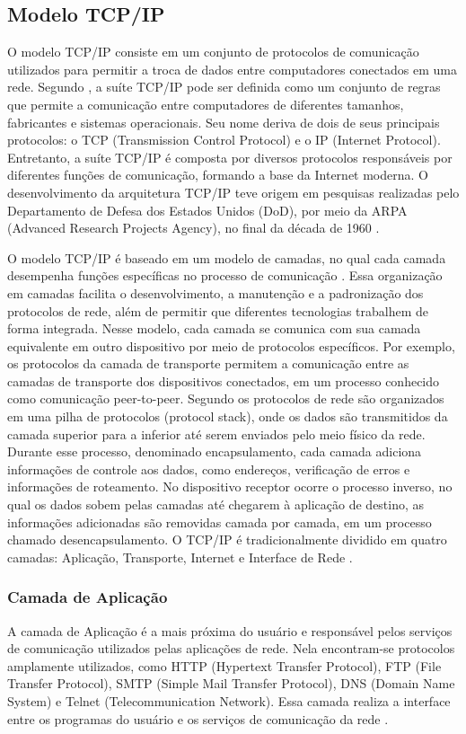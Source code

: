 \documentclass[
    12pt,                %
    openright,           %
    oneside,             %
    a4paper,             %
    english,             %
    brazil               %
]{abntex2}
\begin{document}
\subsection{Modelo TCP/IP}

O modelo TCP/IP consiste em um conjunto de protocolos de comunicação utilizados para permitir a troca de dados entre computadores conectados em uma rede. Segundo , a suíte TCP/IP pode ser definida como um conjunto de regras que permite a comunicação entre computadores de diferentes tamanhos, fabricantes e sistemas operacionais. Seu nome deriva de dois de seus principais protocolos: o TCP (Transmission Control Protocol) e o IP (Internet Protocol). Entretanto, a suíte TCP/IP é composta por diversos protocolos responsáveis por diferentes funções de comunicação, formando a base da Internet moderna. O desenvolvimento da arquitetura TCP/IP teve origem em pesquisas realizadas pelo Departamento de Defesa dos Estados Unidos (DoD), por meio da ARPA (Advanced Research Projects Agency), no final da década de 1960 \cite{Stevens1994}.


O modelo TCP/IP é baseado em um modelo de camadas, no qual cada camada desempenha funções específicas no processo de comunicação \cite{Stevens1994}. Essa organização em camadas facilita o desenvolvimento, a manutenção e a padronização dos protocolos de rede, além de permitir que diferentes tecnologias trabalhem de forma integrada. Nesse modelo, cada camada se comunica com sua camada equivalente em outro dispositivo por meio de protocolos específicos. Por exemplo, os protocolos da camada de transporte permitem a comunicação entre as camadas de transporte dos dispositivos conectados, em um processo conhecido como comunicação peer-to-peer. Segundo  os protocolos de rede são organizados em uma pilha de protocolos (protocol stack), onde os dados são transmitidos da camada superior para a inferior até serem enviados pelo meio físico da rede. Durante esse processo, denominado encapsulamento, cada camada adiciona informações de controle aos dados, como endereços, verificação de erros e informações de roteamento. No dispositivo receptor ocorre o processo inverso, no qual os dados sobem pelas camadas até chegarem à aplicação de destino, as informações adicionadas são removidas camada por camada, em um processo chamado desencapsulamento.
O TCP/IP é tradicionalmente dividido em quatro camadas: Aplicação, Transporte, Internet e Interface de Rede \cite{Stevens1994}.

\subsubsection{Camada de Aplicação}
A camada de Aplicação é a mais próxima do usuário e responsável pelos serviços de comunicação utilizados pelas aplicações de rede. Nela encontram-se protocolos amplamente utilizados, como HTTP (Hypertext Transfer Protocol), FTP (File Transfer Protocol), SMTP (Simple Mail Transfer Protocol), DNS (Domain Name System) e Telnet (Telecommunication Network). Essa camada realiza a interface entre os programas do usuário e os serviços de comunicação da rede \cite{Stevens1994,ESR2020}.
\end{document}
